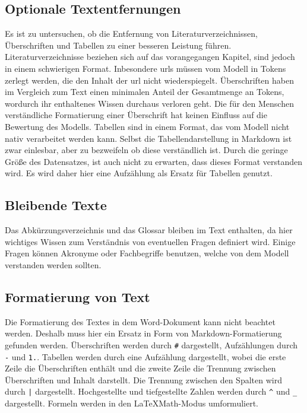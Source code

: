 \subsection{Optionale Textentfernungen}
Es ist zu untersuchen, ob die Entfernung von Literaturverzeichnissen, Überschriften und Tabellen zu einer besseren Leistung führen.
Literaturverzeichnisse beziehen sich auf das vorangegangen Kapitel, sind jedoch in einem schwierigen Format.
Inbesondere \ac{url}s müssen vom Modell in Tokens zerlegt werden, die den Inhalt der \ac{url} nicht wiederspiegelt.
Überschriften haben im Vergleich zum Text einen minimalen Anteil der Gesamtmenge an Tokens, wordurch ihr enthaltenes Wissen durchaus verloren geht.
Die für den Menschen verständliche Formatierung einer Überschrift hat keinen Einfluss auf die Bewertung des Modells.
Tabellen sind in einem Format, das vom Modell nicht nativ verarbeitet werden kann.
Selbst die Tabellendarstellung in Markdown ist zwar einlesbar, aber zu bezweifeln ob diese verständlich ist.
Durch die geringe Größe des Datensatzes, ist auch nicht zu erwarten, dass dieses Format verstanden wird.
Es wird daher hier eine Aufzählung als Ersatz für Tabellen genutzt.

\subsection{Bleibende Texte}
Das Abkürzungsverzeichnis und das Glossar bleiben im Text enthalten, da hier wichtiges Wissen zum Verständnis von eventuellen Fragen definiert wird.
Einige Fragen können Akronyme oder Fachbegriffe benutzen, welche von dem Modell verstanden werden sollten.

\subsection{Formatierung von Text}
Die Formatierung des Textes in dem Word-Dokument kann nicht beachtet werden.
Deshalb muss hier ein Ersatz in Form von Markdown-Formatierung gefunden werden.
Überschriften werden durch \texttt{\#} dargestellt, Aufzählungen durch \texttt{-} und \texttt{1.}.
Tabellen werden durch eine Aufzählung dargestellt, wobei die erste Zeile die Überschriften enthält und die zweite Zeile die Trennung zwischen Überschriften und Inhalt darstellt.
Die Trennung zwischen den Spalten wird durch \texttt{|} dargestellt.
Hochgestellte und tiefgestellte Zahlen werden durch \texttt{\^} und \texttt{\_} dargestellt.
Formeln werden in den \LaTeX Math-Modus umformuliert.

